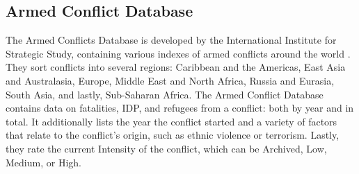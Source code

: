 \subsection{Armed Conflict Database}
The Armed Conflicts Database is developed by the International Institute for Strategic Study, containing various indexes of armed conflicts around the world \cite{conflictDB}. They sort conflicts into several regions: Caribbean and the Americas, East Asia and Australasia, Europe, Middle East and North Africa, Russia and Eurasia, South Asia, and lastly, Sub-Saharan Africa. The Armed Conflict Database contains data on fatalities, IDP, and refugees from a conflict: both by year and in total. It additionally lists the year the conflict started and a variety of factors that relate to the conflict's origin, such as ethnic violence or terrorism. Lastly, they rate the current Intensity of the conflict, which can be Archived, Low, Medium, or High.





